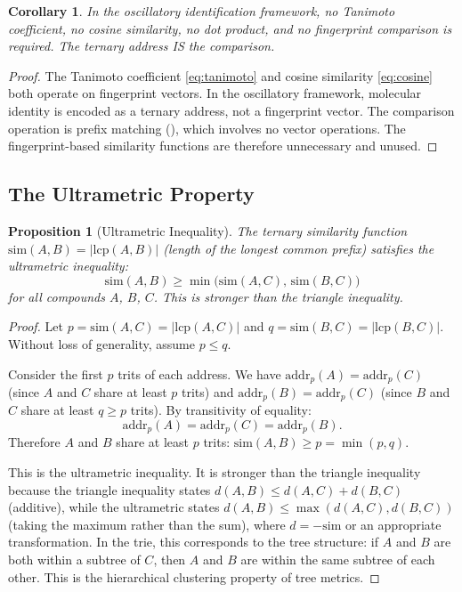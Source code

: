 \documentclass[11pt,twocolumn,a4paper]{article}
\newtheorem{proposition}[theorem]{Proposition}
\newtheorem{corollary}[theorem]{Corollary}
\theoremstyle{definition}
\theoremstyle{remark}
\begin{document}
\begin{corollary}\label{cor:no-similarity}
In the oscillatory identification framework, no Tanimoto coefficient, no cosine similarity, no dot product, and no fingerprint comparison is required. The ternary address IS the comparison.
\end{corollary}

\begin{proof}
The Tanimoto coefficient \eqref{eq:tanimoto} and cosine similarity \eqref{eq:cosine} both operate on fingerprint vectors. In the oscillatory framework, molecular identity is encoded as a ternary address, not a fingerprint vector. The comparison operation is prefix matching (), which involves no vector operations. The fingerprint-based similarity functions are therefore unnecessary and unused.
\end{proof}

\subsection{The Ultrametric Property}\label{sec:ultrametric}

\begin{proposition}[Ultrametric Inequality]\label{prop:ultrametric}
The ternary similarity function $\mathrm{sim}(A, B) = |\mathrm{lcp}(A, B)|$ (length of the longest common prefix) satisfies the ultrametric inequality:
\begin{equation}\label{eq:ultrametric}
  \mathrm{sim}(A, B) \geq \min\bigl(\mathrm{sim}(A, C),\, \mathrm{sim}(B, C)\bigr)
\end{equation}
for all compounds $A$, $B$, $C$. This is stronger than the triangle inequality.
\end{proposition}

\begin{proof}
Let $p = \mathrm{sim}(A, C) = |\mathrm{lcp}(A, C)|$ and $q = \mathrm{sim}(B, C) = |\mathrm{lcp}(B, C)|$. Without loss of generality, assume $p \leq q$.

Consider the first $p$ trits of each address. We have $\mathrm{addr}_p(A) = \mathrm{addr}_p(C)$ (since $A$ and $C$ share at least $p$ trits) and $\mathrm{addr}_p(B) = \mathrm{addr}_p(C)$ (since $B$ and $C$ share at least $q \geq p$ trits). By transitivity of equality:
\[
  \mathrm{addr}_p(A) = \mathrm{addr}_p(C) = \mathrm{addr}_p(B).
\]
Therefore $A$ and $B$ share at least $p$ trits: $\mathrm{sim}(A, B) \geq p = \min(p, q)$.

This is the ultrametric inequality. It is stronger than the triangle inequality because the triangle inequality states $d(A, B) \leq d(A, C) + d(B, C)$ (additive), while the ultrametric states $d(A, B) \leq \max(d(A, C), d(B, C))$ (taking the maximum rather than the sum), where $d = -\mathrm{sim}$ or an appropriate transformation. In the trie, this corresponds to the tree structure: if $A$ and $B$ are both within a subtree of $C$, then $A$ and $B$ are within the same subtree of each other. This is the hierarchical clustering property of tree metrics.
\end{proof}
\end{document}
